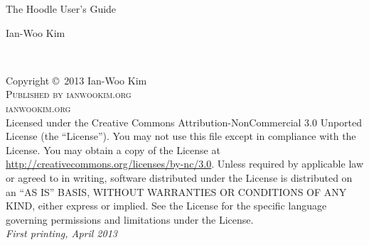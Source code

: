 \documentclass[11pt,fleqn]{book} %
\begin{document}
\setcounter{page}{1}

\begingroup
\thispagestyle{empty}
\centering
\vspace*{9cm}
\par\normalfont\fontsize{35}{35}\sffamily\selectfont
The Hoodle User's Guide\par %
\vspace*{1cm}
{\Huge Ian-Woo Kim}\par %
\endgroup


\newpage
~\vfill
\thispagestyle{empty}

\noindent Copyright \copyright\ 2013 Ian-Woo Kim\\ %

\noindent \textsc{Published by ianwookim.org}\\ %

\noindent \textsc{ianwookim.org}\\ %

\noindent Licensed under the Creative Commons Attribution-NonCommercial 3.0 Unported License (the ``License''). You may not use this file except in compliance with the License. You may obtain a copy of the License at \url{http://creativecommons.org/licenses/by-nc/3.0}. Unless required by applicable law or agreed to in writing, software distributed under the License is distributed on an \textsc{``AS IS'' BASIS, WITHOUT WARRANTIES OR CONDITIONS OF ANY KIND}, either express or implied. See the License for the specific language governing permissions and limitations under the License.\\ %

\noindent \textit{First printing, April 2013} %

\end{document}
